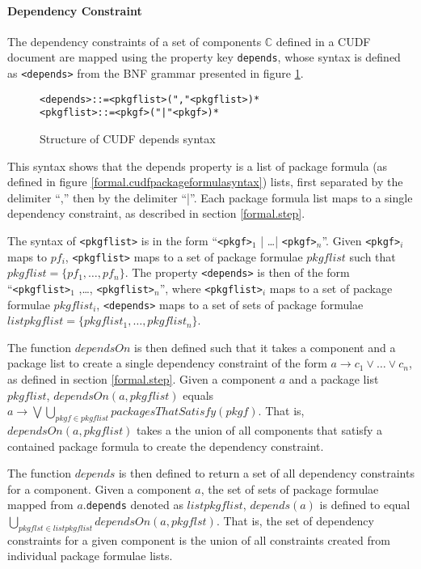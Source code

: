 \paragraph{Dependency Constraint}
The dependency constraints of a set of components $\mathbb{C}$ defined in a CUDF document are mapped using the property key \verb+depends+,
whose syntax is defined as \verb+<depends>+ from the BNF grammar presented in figure \ref{formal.cudfdependssyntax}.

\begin{figure}[htp] 
\begin{center}
\begin{alltt}
<depends> ::= <pkgflist> ("," <pkgflist>)*
<pkgflist> ::= <pkgf> ("|" <pkgf>)*
\end{alltt}
  \caption[CUDF Package depends syntax]{Structure of CUDF depends syntax}
  \label{formal.cudfdependssyntax}
\end{center}
\end{figure}

This syntax shows that the depends property is a list of package formula (as defined in figure \ref{formal.cudfpackageformulasyntax}) lists, 
first separated by the delimiter ``,'' then by the delimiter ``|''.
Each package formula list maps to a single dependency constraint, as described in section \ref{formal.step}.

The syntax of \verb+<pkgflist>+ is in the form ``\verb+<pkgf>+$_1$ | \ldots | \verb+<pkgf>+$_n$''.
Given \verb+<pkgf>+$_i$ maps to $pf_i$, \verb+<pkgflist>+ maps to a set of package formulae $pkgflist$ such that $pkgflist = \{pf_1,\ldots, pf_n\}$.
The property \verb+<depends>+ is then of the form ``\verb+<pkgflist>+$_1$ ,\ldots, \verb+<pkgflist>+$_n$'',
where \verb+<pkgflist>+$_i$ maps to a set of package formulae $pkgflist_i$, \verb+<depends>+ maps to a set of sets of package formulae $listpkgflist = \{pkgflist_1,\ldots,pkgflist_n\}$.

The function $dependsOn$ is then defined such that it takes a component and a package list to create a single dependency constraint of the form $a \rightarrow c_1 \vee \ldots \vee c_n$,
as defined in section \ref{formal.step}.
Given a component $a$ and a package list $pkgflist$, 
$dependsOn(a,pkgflist)$ equals $a \rightarrow \bigvee  \bigcup \limits_{pkgf \in pkgflist} packagesThatSatisfy(pkgf)$.
That is, $dependsOn(a,pkgflist)$ takes a the union of all components that satisfy a contained package formula to create the dependency constraint. 

The function $depends$ is then defined to return a set of all dependency constraints for a component.
Given a component $a$, the set of sets of package formulae mapped from $a$.\verb+depends+ denoted as $listpkgflist$,
$depends(a)$ is defined to equal $\bigcup \limits_{pkgflst \in listpkgflist} dependsOn(a,pkgflst)$.
That is, the set of dependency constraints for a given component is the union of all constraints created from individual package formulae lists.

